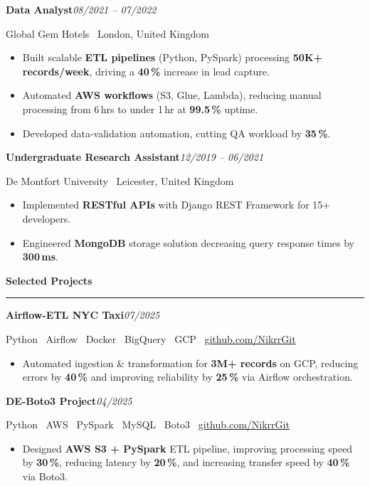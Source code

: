 \documentclass[11pt,a4paper]{article}
\newcommand{\cvsec}[1]{%
  \vspace{8pt}%
  {\large\bfseries\color{accent} #1}\par
  \vspace{3pt}%
  {\color{accent}\rule{\linewidth}{0.9pt}}\par
  \vspace{4pt}%
}
\newcommand{\job}[3]{%
  {\normalsize\bfseries\color{accent} #1}\hfill{\small\itshape #2}\par
  {\small\color{mid} #3}\par
  \vspace{2pt}%
}
\begin{document}
\job{Data Analyst}{08/2021 -- 07/2022}{Global Gem Hotels \textperiodcentered\ London, United Kingdom}
\begin{itemize}
  \item Built scalable \textbf{ETL pipelines} (Python, PySpark) processing \textbf{50K+ records/week}, driving a \textbf{40\,\%} increase in lead capture.
  \item Automated \textbf{AWS workflows} (S3, Glue, Lambda), reducing manual processing from 6\,hrs to under 1\,hr at \textbf{99.5\,\%} uptime.
  \item Developed data-validation automation, cutting QA workload by \textbf{35\,\%}.
\end{itemize}

\job{Undergraduate Research Assistant}{12/2019 -- 06/2021}{De Montfort University \textperiodcentered\ Leicester, United Kingdom}
\begin{itemize}
  \item Implemented \textbf{RESTful APIs} with Django REST Framework for 15+ developers.
  \item Engineered \textbf{MongoDB} storage solution decreasing query response times by \textbf{300\,ms}.
\end{itemize}

\cvsec{Selected Projects}

\job{Airflow-ETL NYC Taxi}{07/2025}{Python \textperiodcentered\ Airflow \textperiodcentered\ Docker \textperiodcentered\ BigQuery \textperiodcentered\ GCP \textperiodcentered\ \href{https://github.com/NikrrGit}{github.com/NikrrGit}}
\begin{itemize}
  \item Automated ingestion \& transformation for \textbf{3M+ records} on GCP, reducing errors by \textbf{40\,\%} and improving reliability by \textbf{25\,\%} via Airflow orchestration.
\end{itemize}

\job{DE-Boto3 Project}{04/2025}{Python \textperiodcentered\ AWS \textperiodcentered\ PySpark \textperiodcentered\ MySQL \textperiodcentered\ Boto3 \textperiodcentered\ \href{https://github.com/NikrrGit}{github.com/NikrrGit}}
\begin{itemize}
  \item Designed \textbf{AWS S3 + PySpark} ETL pipeline, improving processing speed by \textbf{30\,\%}, reducing latency by \textbf{20\,\%}, and increasing transfer speed by \textbf{40\,\%} via Boto3.
\end{itemize}
\end{document}
